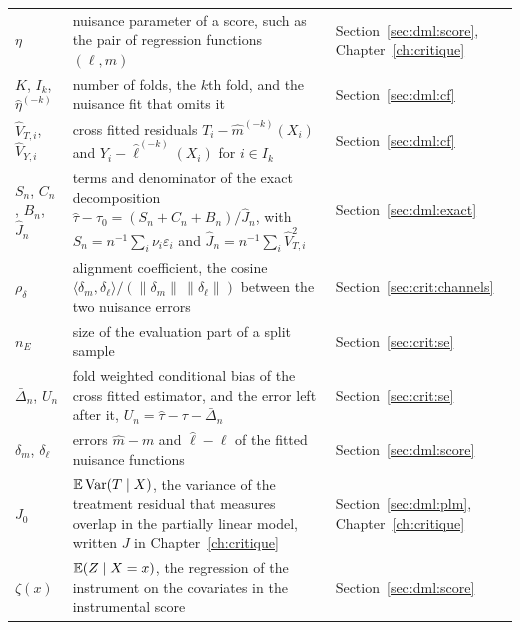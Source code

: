 {\noindent\small\centering
\setlength{\tabcolsep}{4pt}\renewcommand{\arraystretch}{1.1}
\begin{tabular}{>{\raggedright\arraybackslash}p{1.0in}>{\raggedright\arraybackslash}p{2.15in}>{\raggedright\arraybackslash}p{0.95in}}
$\eta$ & nuisance parameter of a score, such as the pair of regression functions $(\ell, m)$ & Section~\ref{sec:dml:score}, Chapter~\ref{ch:critique} \\
$K$, $I_k$, $\hat\eta^{(-k)}$ & number of folds, the $k$th fold, and the nuisance fit that omits it & Section~\ref{sec:dml:cf} \\
$\hat V_{T,i}$, $\hat V_{Y,i}$ & cross fitted residuals $T_i - \hat m^{(-k)}(X_i)$ and $Y_i - \hat\ell^{(-k)}(X_i)$ for $i \in I_k$ & Section~\ref{sec:dml:cf} \\
$S_n$, $C_n$, $B_n$, $\hat J_n$ & terms and denominator of the exact decomposition $\hat\tau - \tau_0 = (S_n + C_n + B_n)/\hat J_n$, with $S_n = n^{-1}\sum_i \nu_i\varepsilon_i$ and $\hat J_n = n^{-1}\sum_i \hat V_{T,i}^2$ & Section~\ref{sec:dml:exact} \\
$\rho_\delta$ & alignment coefficient, the cosine $\langle\delta_m, \delta_\ell\rangle/(\lVert\delta_m\rVert\,\lVert\delta_\ell\rVert)$ between the two nuisance errors & Section~\ref{sec:crit:channels} \\
$n_E$ & size of the evaluation part of a split sample & Section~\ref{sec:crit:se} \\
$\bar\Delta_n$, $U_n$ & fold weighted conditional bias of the cross fitted estimator, and the error left after it, $U_n = \hat\tau - \tau - \bar\Delta_n$ & Section~\ref{sec:crit:se} \\
$\delta_m$, $\delta_\ell$ & errors $\hat m - m$ and $\hat\ell - \ell$ of the fitted nuisance functions & Section~\ref{sec:dml:score} \\
$J_0$ & $\mathbb{E}\,\mathrm{Var}(T \mid X)$, the variance of the treatment residual that measures overlap in the partially linear model, written $J$ in Chapter~\ref{ch:critique} & Section~\ref{sec:dml:plm}, Chapter~\ref{ch:critique} \\
$\zeta(x)$ & $\mathbb{E}(Z \mid X = x)$, the regression of the instrument on the covariates in the instrumental score & Section~\ref{sec:dml:score} \\
\end{tabular}\par}

